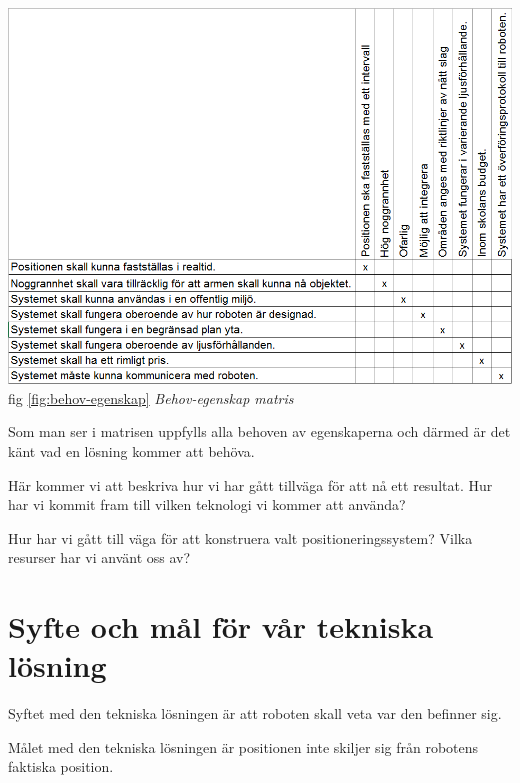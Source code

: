 \documentclass[11pt, a4paper]{report}
\begin{document}
\includegraphics[scale=0.5]{behov-egenskap-matris.PNG}\\
fig \ref{fig:behov-egenskap} \textit{Behov-egenskap matris} %

Som man ser i matrisen uppfylls alla behoven av egenskaperna och därmed är det känt vad en lösning kommer att behöva.



Här kommer vi att beskriva hur vi har gått tillväga för att nå ett resultat. Hur har vi kommit fram till vilken teknologi vi kommer att använda?

Hur har vi gått till väga för att konstruera valt positioneringssystem?
Vilka resurser har vi använt oss av?

\section{Syfte och mål för vår tekniska lösning}
Syftet med den tekniska lösningen är att roboten skall veta var den befinner sig.

Målet med den tekniska lösningen är positionen inte skiljer sig från robotens faktiska position.
\end{document}
